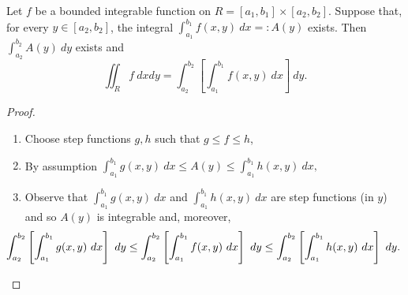 \documentclass[aspectratio=169,handout]{beamer}
\begin{document}
\begin{frame}
    \frametitle{}

    \begin{theorem}
        Let \(f\) be a bounded integrable function on  \(R = [a_1,b_1] \times [a_2,b_2]\).
        Suppose that, for every \(y\in [a_2,b_2]\), the integral \(\int_{a_1}^{b_1} f(x,y) \ dx =: A(y)\) exists.
        Then \(\int_{a_2}^{b_2} A(y) \ dy\) exists and
        \vspace{-1em}
        \[
            \iint_{R} f \ dxdy = \int_{a_2}^{b_2} \left[ \int_{a_1}^{b_1} f(x,y) \ dx  \right] \ dy.
        \]
    \end{theorem}
    \vspace{-1em}
    \begin{proof}
        \begin{enumerate}
            \item Choose step functions \(g,h\) such that \(g\leq f \leq h\),
            \item By assumption \(\int_{a_1}^{b_1} g(x,y) \ dx \leq A(y) \leq \int_{a_1}^{b_1} h(x,y) \ dx,  \)
            \item Observe that \(\int_{a_1}^{b_1} g(x,y) \ dx \) and \(\int_{a_1}^{b_1} h(x,y) \ dx\) are step functions (in \(y\)) and so \(A(y)\) is integrable and, moreover,
                  \[ \hspace{-2em}
                      \int_{a_2}^{b_2} \left[ \int_{a_1}^{b_1} g(x,y) \ dx  \right] \ dy
                      \leq \int_{a_2}^{b_2} \left[ \int_{a_1}^{b_1} f(x,y) \ dx  \right] \ dy
                      \leq \int_{a_2}^{b_2} \left[ \int_{a_1}^{b_1} h(x,y) \ dx  \right] \ dy.
                  \]
        \end{enumerate}
    \end{proof}

\end{frame}
\end{document}
